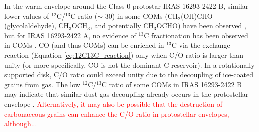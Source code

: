 \documentclass[linenumbers, twocolumn, twocolappendix, astrosymb, times]{aastex631}
\newcommand{\acetaldehyde}{CH$_3$CHO\xspace}
\newcommand{\methylformate}{CH$_3$OCHO\xspace}
\newcommand{\dimethylether}{CH$_3$OCH$_3$\xspace}
\begin{document}
In the warm envelope around the Class 0 protostar IRAS 16293-2422 B, similar lower values of $^{12}$C/$^{13}$C ratio ($\sim$ 30) in some COMs (CH$_2$(OH)CHO (glycolaldehyde), \dimethylether, and potentially \methylformate) have been observed \citep[see Table \ref{tab:12C13C_summary};][]{Jorgensen2016, Jorgensen2018}, but for IRAS 16293-2422 A, no evidence of $^{13}$C fractionation has been observed in COMs \citep[Table \ref{tab:12C13C_summary};][]{Manigand2020}. CO (and thus COMs) can be enriched in $^{13}$C via the exchange reaction (Equation \ref{eq:12C13C_reaction}) only when C/O ratio is larger than unity (or more specifically, CO is not the dominant C reservoir). In a rotationally supported disk, C/O ratio could exceed unity due to the decoupling of ice-coated grains from gas. The low $^{12}$C/$^{13}$C ratio of some COMs in IRAS 16293-2422 B may indicate that similar dust-gas decoupling already occurs in the protostellar envelope \citep[e.g.,][]{Koga2022}. \textcolor{red}{Alternatively, it may also be possible that the destruction of carbonaceous grains can enhance the C/O ratio in protostellar envelopes, although...}






\begin{figure*}
\caption{Kernel density estimate (KDE) of the posterior probability density distributions of $^{12}$C/$^{13}$C ratios for \acetaldehyde, \methylformate, and \dimethylether. Two isomers of $^{13}$C-isotopologues are observed for \acetaldehyde and \methylformate. The probability density is normalized by the peak being unity and offset for visual clarity. The ISM value of 69 is marked by the vertical dashed line.}
\label{fig:12C13C}
\end{figure*}
\end{document}
